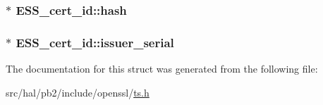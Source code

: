 \subsubsection[{\texorpdfstring{hash}{hash}}]{$\ast$ E\+S\+S\+\_\+cert\+\_\+id\+::hash}\hypertarget{struct_e_s_s__cert__id_a54fc1707932a1ce31d87b48a86bdb22a}{}\label{struct_e_s_s__cert__id_a54fc1707932a1ce31d87b48a86bdb22a}
\subsubsection[{\texorpdfstring{issuer\+\_\+serial}{issuer_serial}}]{$\ast$ E\+S\+S\+\_\+cert\+\_\+id\+::issuer\+\_\+serial}\hypertarget{struct_e_s_s__cert__id_a17dc9c926a3f936f0a9417486d7a55c9}{}\label{struct_e_s_s__cert__id_a17dc9c926a3f936f0a9417486d7a55c9}


The documentation for this struct was generated from the following file\+:\begin{DoxyCompactItemize}
\item 
src/hal/pb2/include/openssl/\hyperlink{ts_8h}{ts.\+h}\end{DoxyCompactItemize}
